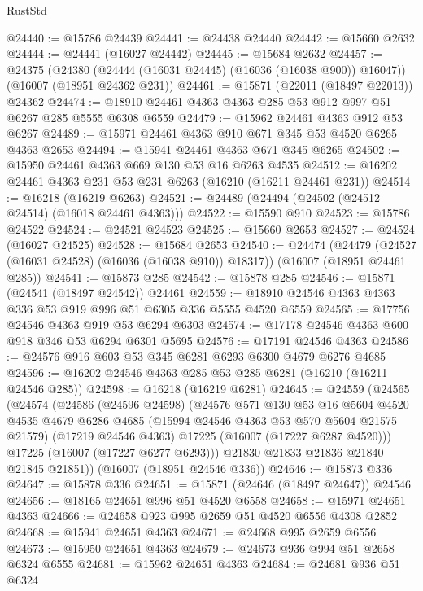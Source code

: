 \begin{lexlean}{RustStd}
\begin{coremodule}
@24440 := @15786 @24439
@24441 := @24438 @24440
@24442 := @15660 @2632
@24444 := @24441 (@16027 @24442)
@24445 := @15684 @2632
@24457 := @24375
    (@24380 (@24444 (@16031 @24445) (@16036 (@16038 @900)) @16047))
    (@16007 (@18951 @24362 @231))
@24461 := @15871 (@22011 (@18497 @22013)) @24362
@24474 := @18910 @24461 @4363 @4363 @285 @53 @912 @997 @51 @6267 @285 @5555 @6308 @6559
@24479 := @15962 @24461 @4363 @912 @53 @6267
@24489 := @15971 @24461 @4363 @910 @671 @345 @53 @4520 @6265 @4363 @2653
@24494 := @15941 @24461 @4363 @671 @345 @6265
@24502 := @15950 @24461 @4363 @669 @130 @53 @16 @6263 @4535
@24512 := @16202 @24461 @4363 @231 @53 @231 @6263 (@16210 (@16211 @24461 @231))
@24514 := @16218 (@16219 @6263)
@24521 := @24489 (@24494 (@24502 (@24512 @24514) (@16018 @24461 @4363)))
@24522 := @15590 @910
@24523 := @15786 @24522
@24524 := @24521 @24523
@24525 := @15660 @2653
@24527 := @24524 (@16027 @24525)
@24528 := @15684 @2653
@24540 := @24474
    (@24479 (@24527 (@16031 @24528) (@16036 (@16038 @910)) @18317))
    (@16007 (@18951 @24461 @285))
@24541 := @15873 @285
@24542 := @15878 @285
@24546 := @15871 (@24541 (@18497 @24542)) @24461
@24559 := @18910 @24546 @4363 @4363 @336 @53 @919 @996 @51 @6305 @336 @5555 @4520 @6559
@24565 := @17756 @24546 @4363 @919 @53 @6294 @6303
@24574 := @17178 @24546 @4363 @600 @918 @346 @53 @6294 @6301 @5695
@24576 := @17191 @24546 @4363
@24586 := @24576 @916 @603 @53 @345 @6281 @6293 @6300 @4679 @6276 @4685
@24596 := @16202 @24546 @4363 @285 @53 @285 @6281 (@16210 (@16211 @24546 @285))
@24598 := @16218 (@16219 @6281)
@24645 := @24559
    (@24565
      (@24574
        (@24586
          (@24596 @24598)
          (@24576
            @571
            @130
            @53
            @16
            @5604
            @4520
            @4535
            @4679
            @6286
            @4685
            (@15994 @24546 @4363 @53 @570 @5604 @21575 @21579)
            (@17219 @24546 @4363)
            @17225
            (@16007 (@17227 @6287 @4520)))
          @17225
          (@16007 (@17227 @6277 @6293)))
        @21830
        @21833
        @21836
        @21840
        @21845
        @21851))
    (@16007 (@18951 @24546 @336))
@24646 := @15873 @336
@24647 := @15878 @336
@24651 := @15871 (@24646 (@18497 @24647)) @24546
@24656 := @18165 @24651 @996 @51 @4520 @6558
@24658 := @15971 @24651 @4363
@24666 := @24658 @923 @995 @2659 @51 @4520 @6556 @4308 @2852
@24668 := @15941 @24651 @4363
@24671 := @24668 @995 @2659 @6556
@24673 := @15950 @24651 @4363
@24679 := @24673 @936 @994 @51 @2658 @6324 @6555
@24681 := @15962 @24651 @4363
@24684 := @24681 @936 @51 @6324

\end{coremodule}
\end{lexlean}

